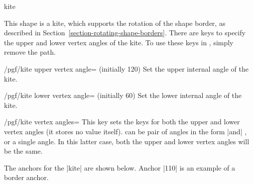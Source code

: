 \par\leavevmode
\begin{shape}{kite}

	This shape is a kite, which supports the rotation of the shape border, 
	as described in Section~\ref{section-rotating-shape-borders}. 
	There are \pgfname{} keys to specify the upper and lower vertex angles
	of the kite. 
	To use these keys in \tikzname, simply remove the  
	path.
	
	\begin{key}{/pgf/kite upper vertex angle= (initially 120)}
	Set the upper internal angle of the kite.
	\end{key}
	
	\begin{key}{/pgf/kite lower vertex angle= (initially 60)}
	Set the lower internal angle of the kite.
	\end{key}
	
	\begin{key}{/pgf/kite vertex angles=}
		This key sets the keys for both the upper and lower vertex angles
		(it stores no value itself).
	    can be pair of angles in the form
	    |and| , or a single angle.
	   In this latter case, both the upper and lower vertex angles will 
	   be the same.
	\end{key}%
    
\begin{codeexample}[]
\end{codeexample}


	The anchors for the |kite| are shown below. Anchor |110| is an 
	example of a border anchor.
	
\begin{codeexample}[]
\Huge
{}
\end{codeexample}
\end{shape}


